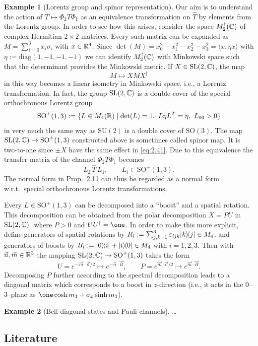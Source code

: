 \documentclass[11pt,a4paper]{article}
\numberwithin{equation}{section}
\theoremstyle{plain}
\theoremstyle{definition}
\newtheorem{example}{Example}[section]
\begin{document}
\begin{example}[Lorentz group and spinor representation]
    Our aim is to understand the action of $T \mapsto \Phi_2T\Phi_1$ as an equivalence
    transformation on $\widehat{T}$ by elements from the Lorentz group. In order to see
    how this arises, consider the space $M_2^\dagger(\mathbb{C})$ of complex Hermitian $2\times 2$
    matrices. Every such matrix can be expanded as $M=\sum_{i=0}^3 x_i\sigma_i$ with
    $x\in \mathbb{R}^4$. Since $\det(M)=x_0^2-x_1^2-x_2^2-x_3^2=\langle x,\eta x\rangle$ with
    $\eta:=\mathrm{diag}(1,-1,-1,-1)$ we can identify $M_2^\dagger(\mathbb{C})$ with Minkowski
    space such that the determinant provides the Minkowski metric. If $X\in \mathrm{SL}(2,\mathbb{C})$,
    the map
    \begin{equation}\label{eq:2.41}
        M \mapsto XMX^\dagger
    \end{equation}
    in this way becomes a linear isometry in Minkowski space, i.e., a Lorentz
    transformation. In fact, the group $\mathrm{SL}(2,\mathbb{C})$ is a double cover of the
    special orthochronous Lorentz group
    \begin{equation}\label{eq:2.42}
        \mathrm{SO}^+(1,3)
        := \{L\in M_4(\RR)\mid \det(L)=1,\ L\eta L^{T}=\eta,\ L_{00}>0\}
    \end{equation}
    in very much the same way as $\mathrm{SU}(2)$ is a double cover of $\mathrm{SO}(3)$.
    The map $\mathrm{SL}(2,\mathbb{C})\to \mathrm{SO}^+(1,3)$ constructed above is sometimes
    called spinor map. It is two-to-one since $\pm X$ have the same effect in
    \eqref{eq:2.41}. Due to this equivalence the transfer matrix of the channel
    $\Phi_2T\Phi_1$ becomes
    \begin{equation}\label{eq:2.43}
        L_2\,\widehat{T}\,L_1,\qquad L_i\in \mathrm{SO}^+(1,3).
    \end{equation}
    The normal form in Prop.~2.11 can thus be regarded as a normal form w.r.t.\ special
    orthochronous Lorentz transformations.

    Every $L\in \mathrm{SO}^+(1,3)$ can be decomposed into a ``boost'' and a spatial
    rotation. This decomposition can be obtained from the polar decomposition $X=PU$ in
    $\mathrm{SL}(2,\mathbb{C})$, where $P>0$ and $UU^\dagger=\one$. In order to make this more
    explicit, define generators of spatial rotations by
    $R_i := \sum_{j,k=1}^3 \varepsilon_{ijk} |k\rangle\!\langle j|\in M_4$, and generators of
    boosts by $B_i := |0\rangle\!\langle i|+|i\rangle\!\langle0|\in M_4$ with $i=1,2,3$. Then with
    $\vec{n},\vec{m}\in \mathbb{R}^3$ the mapping $\mathrm{SL}(2,\mathbb{C})\to \mathrm{SO}^+(1,3)$
    takes the form
    \begin{equation}\label{eq:2.44}
        U = e^{-i\vec{n}\cdot \vec{\sigma}/2} \mapsto e^{-\vec{n}\cdot \vec{R}},\qquad
        P = e^{\vec{m}\cdot \vec{\sigma}/2} \mapsto e^{\vec{m}\cdot \vec{B}}.
    \end{equation}
    Decomposing $P$ further according to the spectral decomposition leads to a diagonal
    matrix which corresponds to a boost in $z$-direction (i.e., it acts in the
    $0$--$3$--plane as $\one \cosh m_3 + \sigma_x \sinh m_3$).
\end{example}

\begin{example}[Bell diagonal states and Pauli channels]
    \dots
\end{example}

\subsection{Literature}
\end{document}
